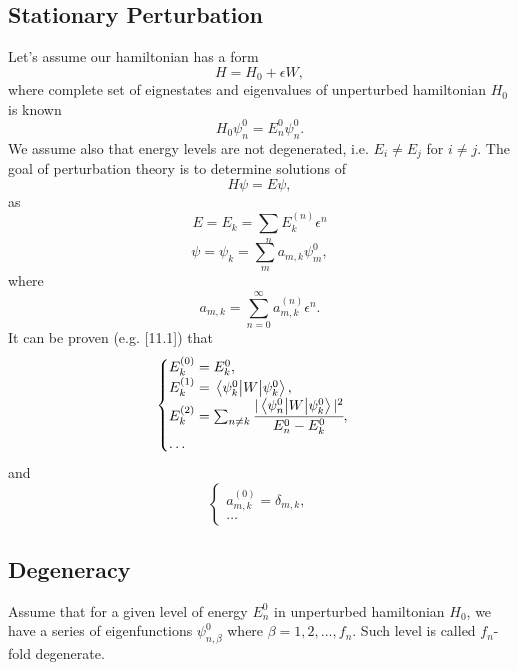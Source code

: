 \documentclass[main.tex]{subfiles}
\begin{document}
\subsection{Stationary Perturbation}
Let's assume our hamiltonian has a form
\begin{equation}
H = H_0 + \epsilon W,
\end{equation}
where complete set of eignestates and eigenvalues of unperturbed hamiltonian $H_0$ is known
\begin{equation}
H_0 \psi^0_n = E^0_n \psi^0_n.
\end{equation}
We assume also that energy levels are not degenerated, i.e.
$E_i \not= E_j$ for $i\not=j$.
The goal of perturbation theory is to determine solutions of 
\begin{equation}
H\psi = E \psi,
\end{equation}
as
\begin{equation}
E = E_k = \sum_{n} E^{(n)}_k\epsilon^n
\end{equation} 
\begin{equation}
\psi = \psi_k = \sum_{m}a_{m,k} \psi_m^0, 
\end{equation}
where 
\begin{equation}
a_{m,k} = \sum_{n=0}^\infty a^{(n)}_{m,k} \epsilon^n. 
\end{equation}
It can be proven (e.g. \cite{walter-greiner2001}[11.1]) that
\begin{equation}
\begin{cases}
E_k^{(0)} = E^0_k, \\
E_k^{(1)} = \mel{\psi_k^0}{W}{\psi_k^0},\\
E_k^{(2)} = \sum_{n\not=k} \cfrac{|\mel{\psi_n^0}{W}{\psi_k^0}|^2}{E^0_n - E^0_k},\\
\dots
\end{cases}
\end{equation}
and
\begin{equation}
\begin{cases}
a^{(0)}_{m, k} = \delta_{m,k},\\
\dots
\end{cases}
\end{equation}
\subsection{Degeneracy}
Assume that for a given level of energy $E^0_n$ in unperturbed hamiltonian $H_0$, we have a series of eigenfunctions $\psi^0_{n,\beta}$ where $\beta=1,2, ..., f_n$. Such level is called $f_n$-fold degenerate.
\end{document}
